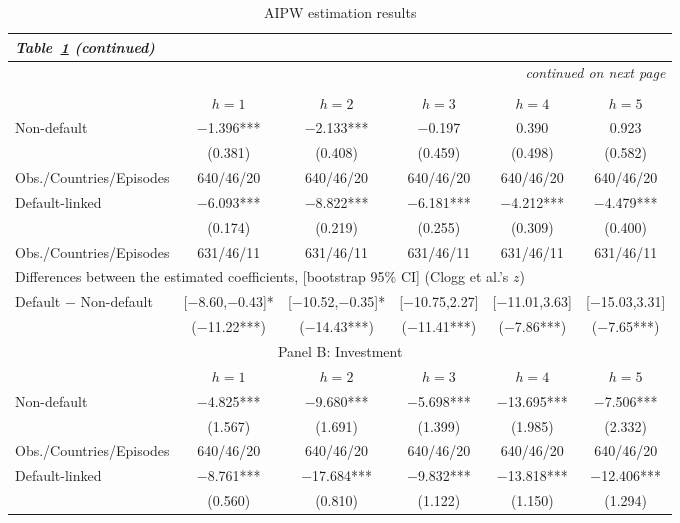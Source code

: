 \documentclass[12pt]{article}
\renewcommand{\arraystretch}{1.25}
\begin{document}
\vspace{14pt}
\begingroup
\footnotesize
\setlength{\tabcolsep}{4pt}
\renewcommand{\arraystretch}{1.0}
\begin{longtable}{lccccc}
\caption{AIPW estimation results}\label{tab:aipw}\\
\endfirsthead
\multicolumn{6}{l}{\normalsize\textit{Table~\ref{tab:aipw} (continued)}} \\
\toprule
\endhead
\midrule
\multicolumn{6}{r}{\textit{continued on next page}} \\
\endfoot
\bottomrule
\endlastfoot
\multicolumn{6}{c}{\large Panel A: GDP} \\
\toprule
 & $h=1$ & $h=2$ & $h=3$ & $h=4$ & $h=5$ \\
\midrule
Non-default & $-$1.396*** & $-$2.133*** & $-$0.197 & 0.390 & 0.923 \\
 & (0.381) & (0.408) & (0.459) & (0.498) & (0.582) \\[1pt]
Obs./Countries/Episodes & 640/46/20 & 640/46/20 & 640/46/20 & 640/46/20 & 640/46/20 \\[3pt]
Default-linked & $-$6.093*** & $-$8.822*** & $-$6.181*** & $-$4.212*** & $-$4.479*** \\
 & (0.174) & (0.219) & (0.255) & (0.309) & (0.400) \\[1pt]
Obs./Countries/Episodes & 631/46/11 & 631/46/11 & 631/46/11 & 631/46/11 & 631/46/11 \\[4pt]
\multicolumn{6}{l}{Differences between the estimated coefficients, [bootstrap 95\% CI] (Clogg et al.'s $z$)} \\[2pt]
Default $-$ Non-default & [$-$8.60,$-$0.43]* & [$-$10.52,$-$0.35]* & [$-$10.75,2.27] & [$-$11.01,3.63] & [$-$15.03,3.31] \\
 & ($-$11.22***) & ($-$14.43***) & ($-$11.41***) & ($-$7.86***) & ($-$7.65***) \\[5pt]
\multicolumn{6}{c}{\large Panel B: Investment} \\
\toprule
 & $h=1$ & $h=2$ & $h=3$ & $h=4$ & $h=5$ \\
\midrule
Non-default & $-$4.825*** & $-$9.680*** & $-$5.698*** & $-$13.695*** & $-$7.506*** \\
 & (1.567) & (1.691) & (1.399) & (1.985) & (2.332) \\[1pt]
Obs./Countries/Episodes & 640/46/20 & 640/46/20 & 640/46/20 & 640/46/20 & 640/46/20 \\[3pt]
Default-linked & $-$8.761*** & $-$17.684*** & $-$9.832*** & $-$13.818*** & $-$12.406*** \\
 & (0.560) & (0.810) & (1.122) & (1.150) & (1.294) \\[1pt]

\end{longtable}
\end{document}

